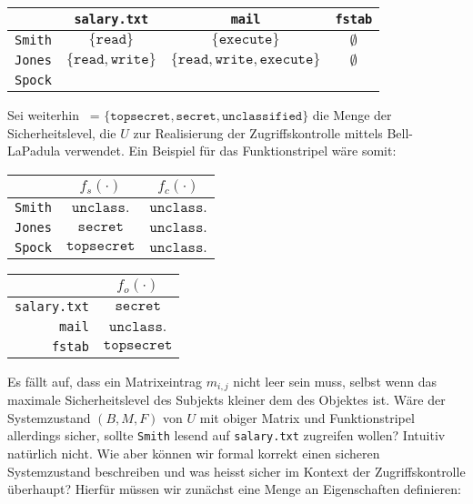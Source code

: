 \bigskip
\begin{center}
	\begin{tabular}{r||c|c|c}
        		& \texttt{salary.txt} & \texttt{mail} & \texttt{fstab} \\
      		\hline
      		\texttt{Smith} & \(\{\texttt{read}\}\) & \(\{\texttt{execute}\}\) & \(\emptyset\) \\
      		\texttt{Jones} & \(\{\texttt{read},\texttt{write}\}\) & \(\{\texttt{read},\texttt{write},\texttt{execute}\}\) & \(\emptyset\) \\
      		\texttt{Spock} & \calA    & \calA       & \calA
	\end{tabular}
\end{center}
\bigskip

Sei weiterhin \calL\ = \(\{\texttt{topsecret}, \texttt{secret}, \texttt{unclassified}\}\) die Menge der Sicherheitslevel, die
\(U\) zur Realisierung der Zugriffskontrolle mittels Bell-LaPadula verwendet. Ein Beispiel für das Funktionstripel
wäre somit:

\bigskip
\begin{center}
      \begin{tabular}{r||c|c}
       & \(f_s(\cdot)\) & \(f_c(\cdot)\) \\
      \hline
      \texttt{Smith} & \(\texttt{unclass.}\) & \(\texttt{unclass.}\) \\
      \texttt{Jones} & \(\texttt{secret}\) & \(\texttt{unclass.}\) \\
      \texttt{Spock} & \(\texttt{topsecret}\) & \(\texttt{unclass.}\)
      \end{tabular}
      \quad
      \begin{tabular}{r||c}
       & \(f_o(\cdot)\) \\
      \hline
      \texttt{salary.txt} & \(\texttt{secret}\) \\
      \texttt{mail} & \(\texttt{unclass.}\) \\
      \texttt{fstab} & \(\texttt{topsecret}\)
      \end{tabular}
\end{center}
\bigskip

Es fällt auf, dass ein Matrixeintrag \(m_{i, j}\) nicht leer sein muss, selbst wenn das maximale Sicherheitslevel des Subjekts
kleiner dem des Objektes ist. Wäre der Systemzustand \((B, M, F)\) von \(U\) mit obiger Matrix und Funktionstripel allerdings
sicher, sollte \texttt{Smith} lesend auf \texttt{salary.txt} zugreifen wollen? Intuitiv natürlich nicht. Wie aber können wir
formal korrekt einen sicheren Systemzustand beschreiben und was heisst sicher im Kontext der Zugriffskontrolle überhaupt? Hierfür müssen wir zunächst eine Menge an Eigenschaften definieren:

